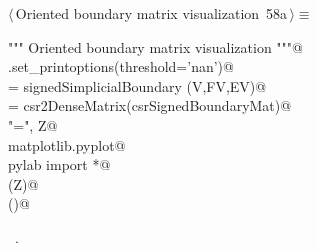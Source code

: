 \documentclass[11pt,oneside]{article}    %
\begin{document}
\begin{flushleft} \small \label{scrap110}
\protect{}$\langle\,$Oriented boundary matrix visualization\nobreak\ {\footnotesize 58a}$\,\rangle\equiv$
\vspace{-1ex}
\begin{list}{}{} \item
\mbox{}\verb@""" Oriented boundary matrix visualization """@\\
\mbox{}\verb@np.set_printoptions(threshold='nan')@\\
\mbox{}\verb@csrSignedBoundaryMat = signedSimplicialBoundary (V,FV,EV)@\\
\mbox{}\verb@Z = csr2DenseMatrix(csrSignedBoundaryMat)@\\
\mbox{}\verb@print "\ncsrSignedBoundaryMat =\n", Z@\\
\mbox{}\verb@import matplotlib.pyplot@\\
\mbox{}\verb@from pylab import *@\\
\mbox{}\verb@matshow(Z)@\\
\mbox{}\verb@show()@\\
\mbox{}\verb@@{\NWsep}
\end{list}
\vspace{-1ex}
\footnotesize\addtolength{\baselineskip}{-1ex}
\begin{list}{}{\setlength{\itemsep}{-\parsep}\setlength{\itemindent}{-\leftmargin}}
\item \NWtxtMacroRefIn\ .
\end{list}
\end{flushleft}
\end{document}
